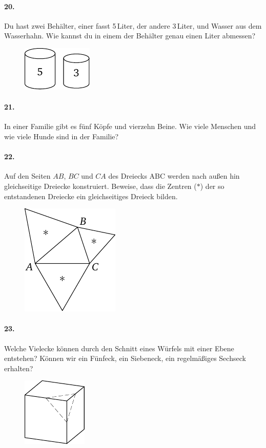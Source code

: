 \documentclass[10pt,a5paper,twoside]{article}
\newenvironment{problem}[1]{\paragraph*{#1}}{}
\begin{document}
\begin{problem}{20.}
	Du hast zwei Behälter, einer fasst 5\,Liter, der andere 3\,Liter, und Wasser aus dem Wasserhahn. Wie kannst du in einem der Behälter genau einen Liter abmessen? 
	\begin{figure}[H]
	\centering
	\footnotesize
	\includegraphics[scale=1]{taskbook-4}
	\end{figure}
\end{problem}

\begin{problem}{21.}
	In einer Familie gibt es fünf Köpfe und vierzehn Beine. Wie viele Menschen und wie viele Hunde sind in der Familie? 
\end{problem}

\begin{problem}{22.}
	Auf den Seiten $AB$, $BC$ und $CA$ des Dreiecks ABC werden nach außen hin gleichseitige Dreiecke konstruiert. Beweise, dass die Zentren ($*$) der so entstandenen Dreiecke ein gleichseitiges Dreieck bilden.
	\begin{figure}[H]
	\centering
	\includegraphics{taskbook-6}
	\end{figure}
\end{problem}

\begin{problem}{23.}
	Welche Vielecke können durch den Schnitt eines Würfels mit einer Ebene entstehen? Können wir ein Fünfeck, ein Siebeneck, ein regelmäßiges Sechseck erhalten? 
	\begin{figure}[H]
	\centering
	\footnotesize
	\includegraphics[scale=1]{taskbook-7}
	\end{figure}
\end{problem}
\end{document}
